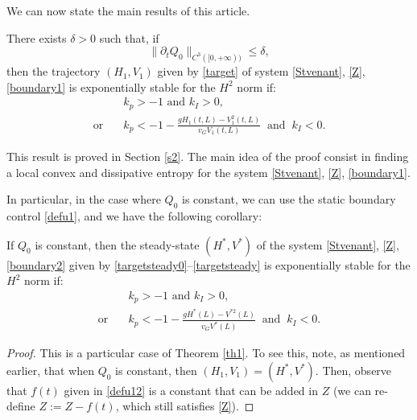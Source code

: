 We can now state the main results of this article.

\begin{thm}\label{th1}
There exists $\delta>0$ such that, if
\[
\lVert\partial_{t}Q_{0}\rVert_{C^{3}([0,+\infty))}\leq \delta,
\]
then the trajectory $(H_{1},V_{1})$ given by \eqref{target} of system \eqref{Stvenant}, \eqref{Z}, \eqref{boundary1} is exponentially stable for the $H^{2}$ norm if:
\begin{equation}
\begin{split}
&k_{p}>-1\text{ and }k_{I}>0,\\
\text{or}\quad&k_{p}<-1-\frac{gH_{1}(t,L)-V^{2}_{1}(t,L)}{v_{G}V_{1}(t,L)}\;\;\text{and}\;\;k_{I}<0.
\end{split}
\label{cond}
\end{equation}
\end{thm}
This result is proved in Section \ref{s2}.
The main idea of the proof consist in finding a local convex and dissipative entropy for the system \eqref{Stvenant}, \eqref{Z}, \eqref{boundary1}.

In particular, in the case where $Q_{0}$ is constant, we can use the static boundary control \eqref{defu1}, and we have the following corollary:
\begin{cor}\label{cor1}
If $Q_{0}$ is constant, then the steady-state $(H^{*},V^{*})$ of the system \eqref{Stvenant}, \eqref{Z}, \eqref{boundary2} given by \eqref{targetsteady0}--\eqref{targetsteady}
is exponentially stable for the $H^{2}$ norm if:
\begin{equation}
\label{cond1}
\begin{split}
&k_{p}>-1\text{ and }k_{I}>0,\\
\text{or}\quad&k_{p}<-1-\frac{gH^{*}(L)-V^{*2}(L)}{v_{G}V^{*}(L)}\;\;\text{and}\;\;k_{I}<0.
\end{split}
\end{equation}
\end{cor}
\begin{proof}
This is a particular case of Theorem \ref{th1}. To see this, note, as mentioned earlier, that when $Q_{0}$ is constant, then $(H_{1},V_{1})=(H^{*},V^{*})$.
Then, observe that $f(t)$ given in \eqref{defu12} is a constant that can be added in $Z$ (\ie we can re-define $Z:=Z-f(t)$, which still satisfies \eqref{Z}).
\end{proof}


